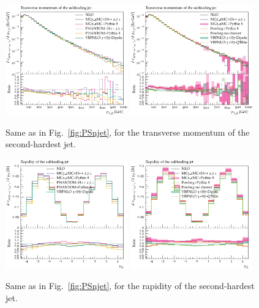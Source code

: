 \begin{figure}[hbt]
\centering
\includegraphics[width=0.47\textwidth]{figures/LOPS/pT_j2.pdf}
\includegraphics[width=0.47\textwidth]{figures/NLOPS/pT_j2.pdf}
\caption{Same as in Fig.~\protect\ref{fig:PSnjet}, for the transverse momentum of the second-hardest jet.}
\label{fig:PSpt2}
\end{figure}

\begin{figure}[hbt]
\centering
\includegraphics[width=0.47\textwidth]{figures/LOPS/y_j2.pdf}
\includegraphics[width=0.47\textwidth]{figures/NLOPS/y_j2.pdf}
\caption{Same as in Fig.~\protect\ref{fig:PSnjet}, for the rapidity of the second-hardest jet.}
\label{fig:PSy2}
\end{figure}

